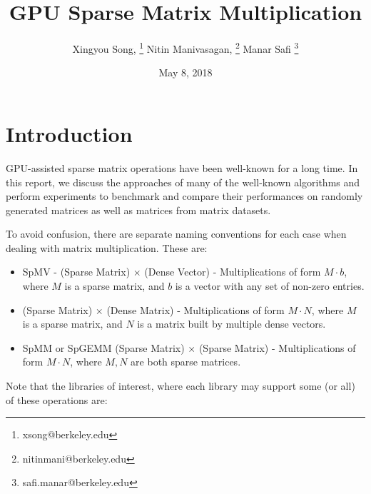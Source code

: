 \documentclass[12pt]{article}
\begin{document}
\nocite{*} 
 

\title{GPU Sparse Matrix Multiplication}
\author{Xingyou Song, \footnote{xsong@berkeley.edu} Nitin Manivasagan, \footnote{nitinmani@berkeley.edu} Manar Safi \footnote{safi.manar@berkeley.edu}}
\date{May 8, 2018} 
\maketitle

\section{Introduction}

\hspace{0.5cm}GPU-assisted sparse matrix operations have been well-known for a long time. In this report, we discuss the approaches of many of the well-known algorithms and perform experiments to benchmark and compare their performances on randomly generated matrices as well as matrices from matrix datasets.

To avoid confusion, there are separate naming conventions for each case when dealing with matrix multiplication. These are: 
\begin{itemize}
\item SpMV - (Sparse Matrix) $\times$ (Dense Vector) - Multiplications of form $M \cdot b$, where $M$ is a sparse matrix, and $b$ is a vector with any set of non-zero entries.
\item (Sparse Matrix) $\times$ (Dense Matrix) - Multiplications of form $M \cdot N$, where $M$ is a sparse matrix, and $N$ is a matrix built by multiple dense vectors. 
\item SpMM or SpGEMM (Sparse Matrix) $\times$ (Sparse Matrix) - Multiplications of form $M \cdot N$, where $M,N$ are both sparse matrices. 
\end{itemize}

Note that the libraries of interest, where each library may support some (or all) of these operations are:
\end{document}

